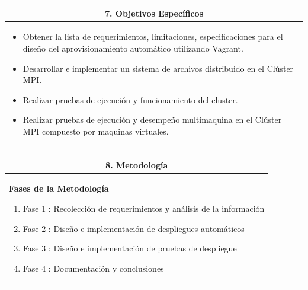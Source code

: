 \documentclass[letter,12pt]{article}
\begin{document}

\begin{center}
\begin{tabular}{|p{15.5cm}|}
\hline
\multicolumn{1}{|c|}{ \textbf{7. Objetivos Específicos}}\\
\hline
\begin{itemize}
	\item Obtener la lista de requerimientos, limitaciones, especificaciones para el diseño del aprovisionamiento automático utilizando Vagrant.
	\item Desarrollar e implementar un sistema de archivos distribuido en el Clúster MPI.
    \item Realizar pruebas de ejecución y funcionamiento del cluster.
    \item Realizar pruebas de ejecución y desempeño multimaquina en el Clúster MPI compuesto por maquinas virtuales.
\end{itemize} \\
\hline
\end{tabular}
\end{center}


\begin{center}
\begin{tabular}{|p{15.5cm}|}
\hline
\multicolumn{1}{|c|}{ \textbf{8. Metodología} }\\
\hline
\textbf{Fases de la Metodología}
    \begin{enumerate}
        \item Fase 1 : Recolección de requerimientos y análisis de la información
        \item Fase 2 : Diseño e implementación de despliegues automáticos
        \item Fase 3 : Diseño e implementación de pruebas de despliegue
        \item Fase 4 : Documentación y conclusiones
        \end{enumerate}\\
\hline
\end{tabular}
\end{center}
\end{document}
